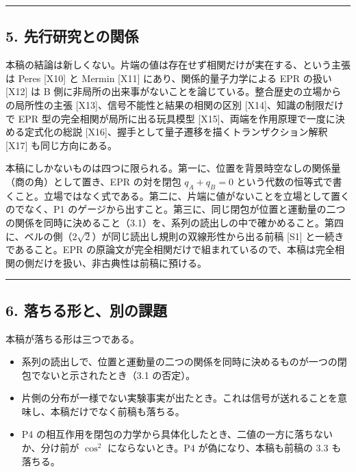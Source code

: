 \documentclass[
  a4paper,
]{ltjsarticle}
\providecommand{\tightlist}{%
  \setlength{\itemsep}{0pt}\setlength{\parskip}{0pt}}
\begin{document}
\begin{center}\rule{0.5\linewidth}{0.5pt}\end{center}

\subsection{5.
先行研究との関係}\label{ux5148ux884cux7814ux7a76ux3068ux306eux95a2ux4fc2}

本稿の結論は新しくない。片端の値は存在せず相関だけが実在する、という主張は
Peres {[}X10{]} と Mermin {[}X11{]} にあり、関係的量子力学による EPR
の扱い {[}X12{]} は B
側に非局所の出来事がないことを論じている。整合歴史の立場からの局所性の主張
{[}X13{]}、信号不能性と結果の相関の区別 {[}X14{]}、知識の制限だけで EPR
型の完全相関が局所に出る玩具模型
{[}X15{]}、両端を作用原理で一度に決める定式化の総説
{[}X16{]}、握手として量子遷移を描くトランザクション解釈 {[}X17{]}
も同じ方向にある。

本稿にしかないものは四つに限られる。第一に、位置を背景時空なしの関係量（商の角）として置き、EPR
の対を閉包 \(q_A+q_B=0\)
という代数の恒等式で書くこと。立場ではなく式である。第二に、片端に値がないことを立場として置くのでなく、P1
のゲージから出すこと。第三に、同じ閉包が位置と運動量の二つの関係を同時に決めること（3.1）を、系列の読出しの中で確かめること。第四に、ベルの側（\(2\sqrt2\)）が同じ読出し規則の双線形性から出る前稿
{[}S1{]} と一続きであること。EPR
の原論文が完全相関だけで組まれているので、本稿は完全相関の側だけを扱い、非古典性は前稿に預ける。

\begin{center}\rule{0.5\linewidth}{0.5pt}\end{center}

\subsection{6.
落ちる形と、別の課題}\label{ux843dux3061ux308bux5f62ux3068ux5225ux306eux8ab2ux984c}

本稿が落ちる形は三つである。

\begin{itemize}
\tightlist
\item
  系列の読出しで、位置と運動量の二つの関係を同時に決めるものが一つの閉包でないと示されたとき（3.1
  の否定）。
\item
  片側の分布が一様でない実験事実が出たとき。これは信号が送れることを意味し、本稿だけでなく前稿も落ちる。
\item
  P4
  の相互作用を閉包の力学から具体化したとき、二値の一方に落ちないか、分け前が
  \(\cos^2\) にならないとき。P4 が偽になり、本稿も前稿の 3.3 も落ちる。
\end{itemize}
\end{document}
